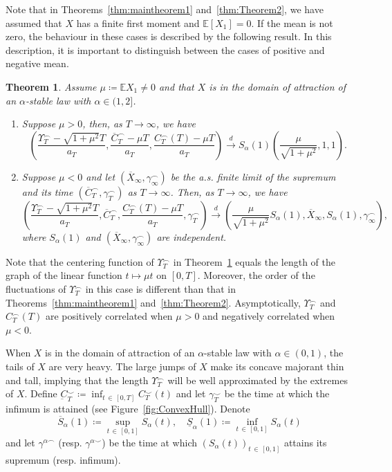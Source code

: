 \documentclass[10pt]{amsart}
\newtheorem{theo}{Theorem}[section]
\theoremstyle{definition}\newtheorem{defi}[theo]{Definition}\newtheorem{rema}[theo]{Remark}\newtheorem{exam}[theo]{Example}\newtheorem{exem}[theo]{Example}\newtheorem{nota}[theo]{Notation}
\newcommand\E{\mathds{E}}
\newcommand\1{\mathds{1}}
\newcommand\cid{\xrightarrow{d}}
\newcommand\ov[1]{\overline{#1}}
\newcommand\un[1]{\underline{#1}}
\newcommand*{\alphenumi}{\renewcommand*{\theenumi}{\alph{enumi}}}
\begin{document}
Note that in Theorems~\ref{thm:maintheorem1} and~\ref{thm:Theorem2}, we have assumed that $X$ has a finite first moment and $\E[X_1]=0$. If the mean is not zero, the behaviour in these cases is described by the following result. In this description, it is important to distinguish between the cases of positive and negative mean.

\begin{theo}\label{thm:Theorem4}
Assume $\mu\coloneqq \E X_1 \ne 0$ and that $X$ is in the domain of attraction of an $\alpha$-stable law with $\alpha \in (1,2]$.
\begin{enumerate}\alphenumi
\item\label{theo1.6.a} Suppose $\mu>0$, then, as $T\to\infty$, we have
\[
\left(
\frac{\Upsilon^\frown_T -\sqrt{1+\mu^2}T}{a_T},
\frac{\ov{C}_T^\frown-\mu T}{a_T},
\frac{C_T^\frown(T)-\mu T}{a_T}\right)
\cid S_\alpha(1)\left(
\frac{\mu}{\sqrt{1+\mu^2}},1,1\right).
\]
\item\label{theo1.6.b} Suppose $\mu<0$ and let $(\ov{X}_\infty,\gamma_\infty^\frown)$ be the a.s. finite limit of the supremum and its time $(\ov{C}_T^\frown,\gamma_T^\frown)$ as $T\to\infty$. Then, as $T\to\infty$, we have
\[
\left(
\frac{\Upsilon^\frown_T -\sqrt{1+\mu^2}T}{a_T},
\ov{C}_T^\frown,
\frac{C_T^\frown(T)-\mu T}{a_T},
\gamma_T^\frown\right)
\cid
\left(
\frac{\mu}{\sqrt{1+\mu^2}}S_\alpha(1),
\ov{X}_\infty,S_\alpha(1),\gamma_\infty^\frown\right),
\]
where $S_\alpha(1)$ and $(\ov{X}_\infty,\gamma_\infty^\frown)$ are independent.
\end{enumerate}
\end{theo}

Note that the centering function of $\Upsilon_T^\frown$ in Theorem~\ref{thm:Theorem4} equals the length of the graph of the linear function $t\mapsto\mu t$ on $[0,T]$. Moreover, the order of the fluctuations of $\Upsilon_T^\frown$ in this case is different than that in Theorems~\ref{thm:maintheorem1} and~\ref{thm:Theorem2}. Asymptotically, $\Upsilon_T^\frown$ and $C_T^\frown(T)$ are positively correlated when $\mu>0$ and negatively correlated when $\mu<0$.

When $X$ is in the domain of attraction of an $\alpha$-stable law with $\alpha\in(0,1)$, the tails of $X$ are very heavy. The large jumps of $X$ make its concave majorant thin and tall, implying that the length $\Upsilon_T^\frown$ will be well approximated by the extremes of $X$. Define $\underbar{C}_T^\smile\coloneqq \inf_{t\,\in\,[0,T]}C_T^\smile(t)$ and let $\gamma_T^\smile$ be the time at which the infimum is attained (see Figure~\ref{fig:ConvexHull}). Denote
\[
\ov{S}_\alpha(1)\coloneqq \sup_{t\,\in\,[0,1]}S_\alpha(t),\quad \un{S}_\alpha(1)\coloneqq \inf_{t\,\in\,[0,1]}S_\alpha(t)
\]
and let $\gamma^{\alpha\frown}$ (resp. $\gamma^{\alpha\smile}$) be the time at which $(S_\alpha(t))_{t\,\in\,[0,1]}$ attains its supremum (resp. infi\-mum).
\end{document}
